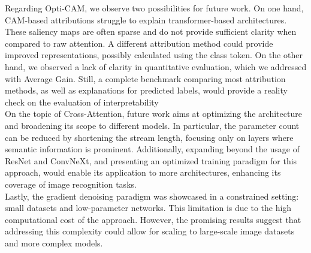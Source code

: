 \noindent Regarding Opti-CAM, we observe two possibilities for future work. On one hand, CAM-based 
attributions struggle to explain transformer-based architectures. These saliency maps are often 
sparse and do not provide sufficient clarity when compared to raw attention. A different 
attribution method could provide improved representations, possibly calculated using the class 
token. On the other hand, we observed a lack of clarity in quantitative evaluation, which we 
addressed with Average Gain. Still, a complete benchmark comparing most attribution methods, 
as well as explanations for predicted labels, would provide a reality check on the evaluation 
of interpretability\\

\noindent On the topic of Cross-Attention, future work aims at optimizing the architecture and 
broadening its scope to different models. In particular, the parameter count can be reduced by 
shortening the stream length, focusing only on layers where semantic information is prominent. 
Additionally, expanding beyond the usage of ResNet and ConvNeXt, and presenting an optimized 
training paradigm for this approach, would enable its application to more architectures, enhancing 
its coverage of image recognition tasks.\\

\noindent Lastly, the gradient denoising paradigm was showcased in a constrained setting: small datasets and low-parameter networks. This limitation is due to the high computational cost of the approach. However, the promising results suggest that addressing this complexity could allow for scaling to large-scale image datasets and more complex models.\\